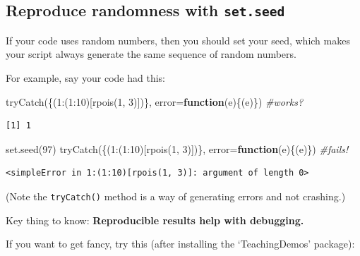 \documentclass[
  letterpaper,
  DIV=11,
  numbers=noendperiod]{scrreprt}
\newenvironment{Shaded}{\begin{snugshade}}{\end{snugshade}}
\newcommand{\AttributeTok}[1]{\textcolor[rgb]{0.49,0.56,0.16}{#1}}
\newcommand{\CommentTok}[1]{\textcolor[rgb]{0.38,0.63,0.69}{\textit{#1}}}
\newcommand{\ControlFlowTok}[1]{\textcolor[rgb]{0.00,0.44,0.13}{\textbf{#1}}}
\newcommand{\DecValTok}[1]{\textcolor[rgb]{0.25,0.63,0.44}{#1}}
\newcommand{\FunctionTok}[1]{\textcolor[rgb]{0.02,0.16,0.49}{#1}}
\newcommand{\NormalTok}[1]{\textcolor[rgb]{0.00,0.44,0.13}{#1}}
\newcommand{\SpecialCharTok}[1]{\textcolor[rgb]{0.25,0.44,0.63}{#1}}
\begin{document}
\hypertarget{reproduce-randomness-with-set.seed}{%
\subsection{\texorpdfstring{Reproduce randomness with
\texttt{set.seed}}{Reproduce randomness with set.seed}}\label{reproduce-randomness-with-set.seed}}

If your code uses random numbers, then you should set your seed, which
makes your script always generate the same sequence of random numbers.

For example, say your code had this:

\begin{Shaded}
\begin{Highlighting}[]
\FunctionTok{tryCatch}\NormalTok{(\{(}\DecValTok{1}\SpecialCharTok{:}\NormalTok{(}\DecValTok{1}\SpecialCharTok{:}\DecValTok{10}\NormalTok{)[}\FunctionTok{rpois}\NormalTok{(}\DecValTok{1}\NormalTok{, }\DecValTok{3}\NormalTok{)])\}, }\AttributeTok{error=}\ControlFlowTok{function}\NormalTok{(e)\{(e)\}) }\CommentTok{\#works?}
\end{Highlighting}
\end{Shaded}

\begin{verbatim}
[1] 1
\end{verbatim}

\begin{Shaded}
\begin{Highlighting}[]
\FunctionTok{set.seed}\NormalTok{(}\DecValTok{97}\NormalTok{)}
\FunctionTok{tryCatch}\NormalTok{(\{(}\DecValTok{1}\SpecialCharTok{:}\NormalTok{(}\DecValTok{1}\SpecialCharTok{:}\DecValTok{10}\NormalTok{)[}\FunctionTok{rpois}\NormalTok{(}\DecValTok{1}\NormalTok{, }\DecValTok{3}\NormalTok{)])\}, }\AttributeTok{error=}\ControlFlowTok{function}\NormalTok{(e)\{(e)\}) }\CommentTok{\#fails!}
\end{Highlighting}
\end{Shaded}

\begin{verbatim}
<simpleError in 1:(1:10)[rpois(1, 3)]: argument of length 0>
\end{verbatim}

(Note the \texttt{tryCatch()} method is a way of generating errors and
not crashing.)

Key thing to know: \textbf{Reproducible results help with debugging.}

If you want to get fancy, try this (after installing the `TeachingDemos'
package):
\end{document}
